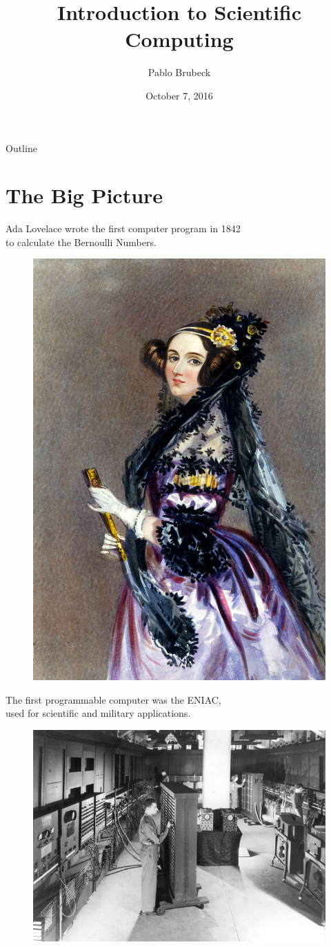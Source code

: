 \documentclass[xcolor={dvipsnames}]{beamer}
\title{Introduction to Scientific Computing}
\author{Pablo Brubeck\inst{}}
\institute[ITESM]{
  \inst{}
  Department of Physics\\
  Tecnologico de Monterrey
}
\date{October 7, 2016}
\begin{document}
\begin{frame}
  \titlepage
\end{frame}

\begin{frame}{Outline}
  \tableofcontents
\end{frame}


\section{The Big Picture}

\begin{frame}{Ada Lovelace wrote the first computer program in 1842\\ to calculate the Bernoulli Numbers.}{}
\begin{figure}
\centering
\includegraphics[width=0.4\linewidth]{AdaLovelace}
\label{fig:AdaLovelace}
\end{figure}

\end{frame}

\begin{frame}{The first programmable computer was the ENIAC,\\ used for scientific and military applications.}{}
\begin{figure}
\centering
\includegraphics[width=0.7\linewidth]{ENIAC}
\label{fig:ENIAC}
\end{figure}
\end{frame}
\end{document}
